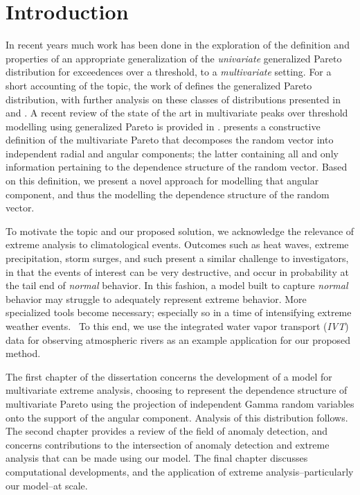 

\section{Introduction}
In recent years much work has been done in the exploration of the definition and properties of an
  appropriate generalization of the \emph{univariate} generalized Pareto distribution for exceedences
  over a threshold, to a \emph{multivariate} setting.  For a short accounting of the topic, the work of
  \cite{rootzen2006} defines the generalized Pareto distribution, with further analysis on these classes
  of distributions presented in \cite{falk2008} and \cite{michel2008}.  A recent review of the state
  of the art in multivariate peaks over threshold modelling using generalized Pareto is provided in
  \cite{rootzen2018}.  \cite{ferreira2014} presents a constructive definition of the multivariate Pareto
  that decomposes the random vector into independent radial and angular components; the latter
  containing all and only information pertaining to the dependence structure of the random vector.
  Based on this definition, we present a novel approach for modelling that angular component, and thus
  the modelling the dependence structure of the random vector.

To motivate the topic and our proposed solution, we acknowledge the relevance of extreme analysis to
  climatological events.  Outcomes such as heat waves, extreme precipitation, storm surges, and
  such present a similar challenge to investigators, in that the events of interest can be very destructive,
  and occur in probability at the tail end of \emph{normal} behavior.  In this fashion, a model built
  to capture \emph{normal} behavior may struggle to adequately represent extreme behavior.  More
  specialized tools become necessary; especially so in a time of intensifying extreme weather
  events.~\citep{jentsch2007,vousdoukas2018,li2019}  To this end, we use the integrated water vapor
  transport (\emph{IVT}) data for observing atmospheric rivers as an example application for our proposed method.

The first chapter of the dissertation concerns the development of a model for multivariate extreme analysis,
  choosing to represent the dependence structure of multivariate Pareto using the projection of independent
  Gamma random variables onto the support of the angular component.  Analysis of this distribution follows.
  The second chapter provides a review of the field of anomaly detection, and concerns contributions
  to the intersection of anomaly detection and extreme analysis that can be made using our model.
  The final chapter discusses computational developments, and the application of extreme
  analysis--particularly our model--at scale.

